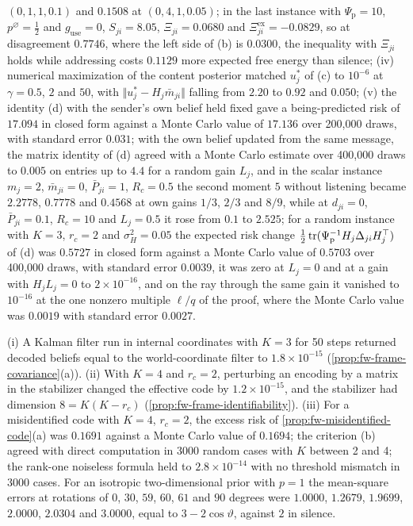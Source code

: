 \begin{numcheck}
$(0,1,1,0.1)$ and $0.1508$ at $(0,4,1,0.05)$; in the last instance with $\Psi_{\mathrm p}=10$, $p^\varnothing=\tfrac12$ and $g_{\mathrm{use}}=0$, $S_{ji}=8.05$, $\Xi_{ji}=0.0680$ and $\Xi^{\mathrm{ex}}_{ji}=-0.0829$, so at disagreement $0.7746$, where the left side of (b) is $0.0300$, the inequality with $\Xi_{ji}$ holds while addressing costs $0.1129$ more expected free energy than silence; (iv) numerical maximization of the content posterior matched $u_j^\ast$ of (c) to $10^{-6}$ at $\gamma=0.5$, $2$ and $50$, with $\Vert u_j^\ast-H_j\bar m_{ji}\Vert$ falling from $2.20$ to $0.92$ and $0.050$; (v) the identity (d) with the sender's own belief held fixed gave a being-predicted risk of $17.094$ in closed form against a Monte Carlo value of $17.136$ over 200{,}000 draws, with standard error $0.031$; with the own belief updated from the same message, the matrix identity of (d) agreed with a Monte Carlo estimate over 400{,}000 draws to $0.005$ on entries up to $4.4$ for a random gain $L_j$, and in the scalar instance $m_j=2$, $\bar m_{ji}=0$, $\bar P_{ji}=1$, $R_c=0.5$ the second moment $5$ without listening became $2.2778$, $0.7778$ and $0.4568$ at own gains $1/3$, $2/3$ and $8/9$, while at $d_{ji}=0$, $\bar P_{ji}=0.1$, $R_c=10$ and $L_j=0.5$ it rose from $0.1$ to $2.525$; for a random instance with $K=3$, $r_c=2$ and $\sigma_H^2=0.05$ the expected risk change $\tfrac12\operatorname{tr}(\Psi_{\mathrm p}^{-1}H_j\Delta_{ji}H_j^\top)$ of (d) was $0.5727$ in closed form against a Monte Carlo value of $0.5703$ over 400{,}000 draws, with standard error $0.0039$, it was zero at $L_j=0$ and at a gain with $H_jL_j=0$ to $2\times10^{-16}$, and on the ray through the same gain it vanished to $10^{-16}$ at the one nonzero multiple $\ell/q$ of the proof, where the Monte Carlo value was $0.0019$ with standard error $0.0027$.
\end{numcheck}

\begin{numcheck}[Frames]\label{chk:fw-frames}
(i) A Kalman filter run in internal coordinates with $K=3$ for 50 steps returned decoded beliefs equal to the world-coordinate filter to $1.8\times10^{-15}$ (\cref{prop:fw-frame-covariance}(a)). (ii) With $K=4$ and $r_c=2$, perturbing an encoding by a matrix in the stabilizer changed the effective code by $1.2\times10^{-15}$, and the stabilizer had dimension $8=K(K-r_c)$ (\cref{prop:fw-frame-identifiability}). (iii) For a misidentified code with $K=4$, $r_c=2$, the excess risk of \cref{prop:fw-misidentified-code}(a) was $0.1691$ against a Monte Carlo value of $0.1694$; the criterion (b) agreed with direct computation in 3000 random cases with $K$ between 2 and 4; the rank-one noiseless formula held to $2.8\times10^{-14}$ with no threshold mismatch in 3000 cases. For an isotropic two-dimensional prior with $p=1$ the mean-square errors at rotations of $0$, $30$, $59$, $60$, $61$ and $90$ degrees were $1.0000$, $1.2679$, $1.9699$, $2.0000$, $2.0304$ and $3.0000$, equal to $3-2\cos\vartheta$, against $2$ in silence.
\end{numcheck}

